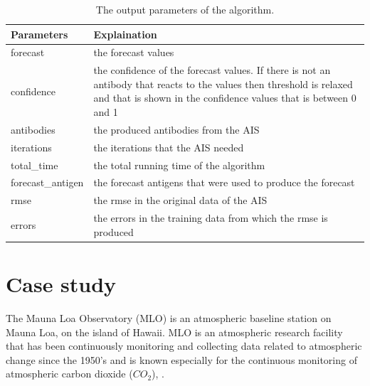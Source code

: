 \documentclass{assignment}
\begin{document}
\begin{table}
\begin{center}
  \begin{tabular}{|m{}|m{}|}
    \hline
    {\bf Parameters} & {\bf Explaination}\\ \hline \hline

	forecast & the forecast values \\ \hline	

	confidence & the confidence of the forecast values. If there is not an antibody that reacts to the values then threshold is relaxed and that is shown in the confidence values that is between 0 and 1 \\ \hline	

	antibodies & the produced antibodies from the AIS \\ \hline	

	iterations & the iterations that the AIS needed \\ \hline	

	total\_time & the total running time of the algorithm \\ \hline	

	forecast\_antigen & the forecast antigens that were used to produce the forecast \\ \hline	

	rmse & the rmse in the original data of the AIS \\ \hline	

	errors & the errors in the training data from which the rmse is produced \\ \hline	

\hline \hline
  \end{tabular}
\caption{The output parameters of the algorithm.}
\label{table:output_parameters}
\end{center}
\end{table}

\section{Case study}

The Mauna Loa Observatory (MLO) is an atmospheric baseline station on Mauna Loa, on the island of Hawaii. MLO is an atmospheric research facility that has been continuously monitoring and collecting data related to atmospheric change since the 1950's and is known especially for the continuous monitoring of atmospheric carbon dioxide ($CO_2$), \cite{wiki:mauna}.
\end{document}
